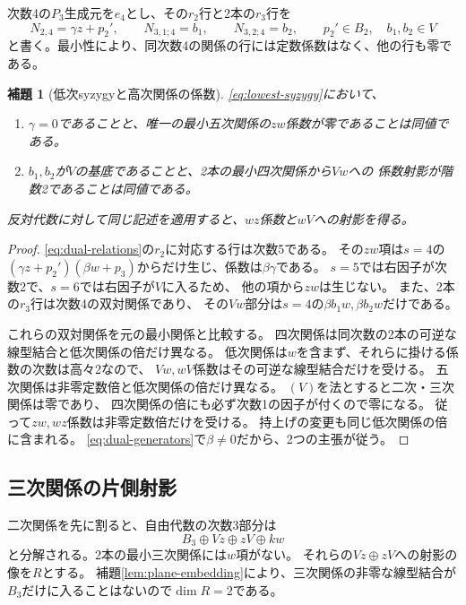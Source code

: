 \documentclass[11pt,a4paper]{ltjsarticle}
\newtheorem{lemma}[theorem]{補題}
\theoremstyle{definition}
\begin{document}
次数4の$P_3$生成元を$e_4$とし、その$r_2$行と2本の$r_3$行を
\begin{equation}\label{eq:lowest-syzygy}
N_{2,4}=\gamma z+p_2',\qquad
N_{3,1;4}=b_1,\qquad N_{3,2;4}=b_2,\qquad
p_2'\in B_2,\quad b_1,b_2\in V
\end{equation}
と書く。最小性により、同次数4の関係の行には定数係数はなく、他の行も零である。

\begin{lemma}[低次syzygyと高次関係の係数]\label{lem:dual-coefficients}
\eqref{eq:lowest-syzygy}において、
\begin{enumerate}
\item $\gamma=0$であることと、唯一の最小五次関係の$zw$係数が零であることは同値である。
\item $b_1,b_2$が$V$の基底であることと、2本の最小四次関係から$Vw$への
係数射影が階数2であることは同値である。
\end{enumerate}
反対代数に対して同じ記述を適用すると、$wz$係数と$wV$への射影を得る。
\end{lemma}
\begin{proof}
\eqref{eq:dual-relations}の$r_2$に対応する行は次数5である。
その$zw$項は$s=4$の
$(\gamma z+p_2')(\beta w+p_3)$からだけ生じ、係数は$\beta\gamma$である。
$s=5$では右因子が次数2で、$s=6$では右因子が$V$に入るため、
他の項から$zw$は生じない。
また、2本の$r_3$行は次数4の双対関係であり、
その$Vw$部分は$s=4$の$\beta b_1w,\beta b_2w$だけである。

これらの双対関係を元の最小関係と比較する。
四次関係は同次数の2本の可逆な線型結合と低次関係の倍だけ異なる。
低次関係は$w$を含まず、それらに掛ける係数の次数は高々2なので、
$Vw,wV$係数はその可逆な線型結合だけを受ける。
五次関係は非零定数倍と低次関係の倍だけ異なる。
$(V)$を法とすると二次・三次関係は零であり、
四次関係の倍にも必ず次数1の因子が付くので零になる。
従って$zw,wz$係数は非零定数倍だけを受ける。
持上げの変更も同じ低次関係の倍に含まれる。
\eqref{eq:dual-generators}で$\beta\ne0$だから、2つの主張が従う。
\end{proof}

\subsection{三次関係の片側射影}
二次関係を先に割ると、自由代数の次数3部分は
\[
B_3\oplus Vz\oplus zV\oplus kw
\]
と分解される。2本の最小三次関係には$w$項がない。
それらの$Vz\oplus zV$への射影の像を$R$とする。
補題\ref{lem:plane-embedding}により、三次関係の非零な線型結合が
$B_3$だけに入ることはないので$\dim R=2$である。
\end{document}
